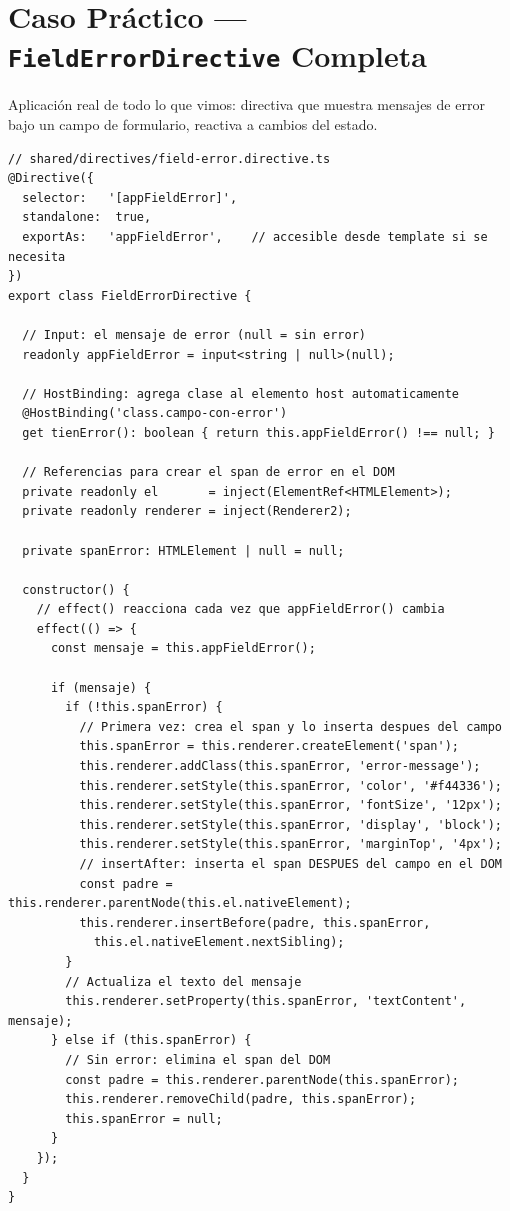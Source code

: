 \documentclass[12pt, a4paper]{article}
\begin{document}
\section{  Caso Práctico --- \texttt{FieldErrorDirective} Completa}

Aplicación real de todo lo que vimos: directiva que muestra mensajes de error
bajo un campo de formulario, reactiva a cambios del estado.

\begin{lstlisting}
// shared/directives/field-error.directive.ts
@Directive({
  selector:   '[appFieldError]',
  standalone:  true,
  exportAs:   'appFieldError',    // accesible desde template si se necesita
})
export class FieldErrorDirective {

  // Input: el mensaje de error (null = sin error)
  readonly appFieldError = input<string | null>(null);

  // HostBinding: agrega clase al elemento host automaticamente
  @HostBinding('class.campo-con-error')
  get tienError(): boolean { return this.appFieldError() !== null; }

  // Referencias para crear el span de error en el DOM
  private readonly el       = inject(ElementRef<HTMLElement>);
  private readonly renderer = inject(Renderer2);

  private spanError: HTMLElement | null = null;

  constructor() {
    // effect() reacciona cada vez que appFieldError() cambia
    effect(() => {
      const mensaje = this.appFieldError();

      if (mensaje) {
        if (!this.spanError) {
          // Primera vez: crea el span y lo inserta despues del campo
          this.spanError = this.renderer.createElement('span');
          this.renderer.addClass(this.spanError, 'error-message');
          this.renderer.setStyle(this.spanError, 'color', '#f44336');
          this.renderer.setStyle(this.spanError, 'fontSize', '12px');
          this.renderer.setStyle(this.spanError, 'display', 'block');
          this.renderer.setStyle(this.spanError, 'marginTop', '4px');
          // insertAfter: inserta el span DESPUES del campo en el DOM
          const padre = this.renderer.parentNode(this.el.nativeElement);
          this.renderer.insertBefore(padre, this.spanError,
            this.el.nativeElement.nextSibling);
        }
        // Actualiza el texto del mensaje
        this.renderer.setProperty(this.spanError, 'textContent', mensaje);
      } else if (this.spanError) {
        // Sin error: elimina el span del DOM
        const padre = this.renderer.parentNode(this.spanError);
        this.renderer.removeChild(padre, this.spanError);
        this.spanError = null;
      }
    });
  }
}
\end{lstlisting}
\end{document}
